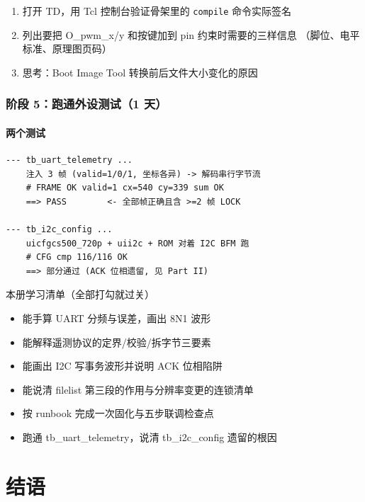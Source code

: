 \documentclass[11pt]{ctexart}
\newcommand{\code}[1]{\texttt{#1}}
\begin{document}
\begin{enumerate}
  \item 打开 TD，用 Tcl 控制台验证骨架里的 \code{compile} 命令实际签名
  \item 列出要把 O\_pwm\_x/y 和按键加到 pin 约束时需要的三样信息
    （脚位、电平标准、原理图页码）
  \item 思考：Boot Image Tool 转换前后文件大小变化的原因
\end{enumerate}

\section{阶段 5：跑通外设测试（1 天）}

\subsection{两个测试}

\begin{Verbatim}
--- tb_uart_telemetry ...
    注入 3 帧 (valid=1/0/1, 坐标各异) -> 解码串行字节流
    # FRAME OK valid=1 cx=540 cy=339 sum OK
    ==> PASS        <- 全部帧正确且含 >=2 帧 LOCK

--- tb_i2c_config ...
    uicfgcs500_720p + uii2c + ROM 对着 I2C BFM 跑
    # CFG cmp 116/116 OK
    ==> 部分通过 (ACK 位相遗留, 见 Part II)
\end{Verbatim}

\begin{okbox}{本册学习清单（全部打勾就过关）}
\begin{itemize}
  \item 能手算 UART 分频与误差，画出 8N1 波形
  \item 能解释遥测协议的定界/校验/拆字节三要素
  \item 能画出 I2C 写事务波形并说明 ACK 位相陷阱
  \item 能说清 filelist 第三段的作用与分辨率变更的连锁清单
  \item 按 runbook 完成一次固化与五步联调检查点
  \item 跑通 tb\_uart\_telemetry，说清 tb\_i2c\_config 遗留的根因
\end{itemize}
\end{okbox}



\part*{结语}
\clearpage
\end{document}
